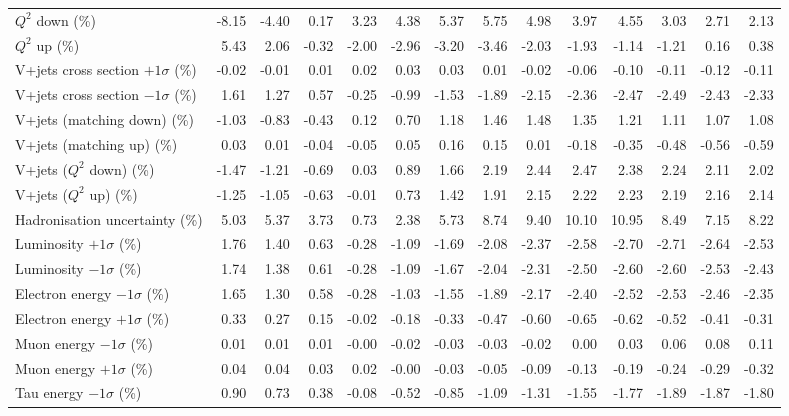 \begin{table}[htbp]
{\begin{tabular}{lrrrrrrrrrrrrr}
$Q^{2}$ down (\%) & -8.15 & -4.40 & 0.17 & 3.23 & 4.38 & 5.37 & 5.75 & 4.98 & 3.97 & 4.55 & 3.03 & 2.71 & 2.13 \\ 
$Q^{2}$ up (\%) & 5.43 & 2.06 & -0.32 & -2.00 & -2.96 & -3.20 & -3.46 & -2.03 & -1.93 & -1.14 & -1.21 & 0.16 & 0.38 \\ 
V+jets cross section \ensuremath{+1\sigma} (\%) & -0.02 & -0.01 & 0.01 & 0.02 & 0.03 & 0.03 & 0.01 & -0.02 & -0.06 & -0.10 & -0.11 & -0.12 & -0.11 \\ 
V+jets cross section \ensuremath{-1\sigma} (\%) & 1.61 & 1.27 & 0.57 & -0.25 & -0.99 & -1.53 & -1.89 & -2.15 & -2.36 & -2.47 & -2.49 & -2.43 & -2.33 \\ 
V+jets (matching down) (\%) & -1.03 & -0.83 & -0.43 & 0.12 & 0.70 & 1.18 & 1.46 & 1.48 & 1.35 & 1.21 & 1.11 & 1.07 & 1.08 \\ 
V+jets (matching up) (\%) & 0.03 & 0.01 & -0.04 & -0.05 & 0.05 & 0.16 & 0.15 & 0.01 & -0.18 & -0.35 & -0.48 & -0.56 & -0.59 \\ 
V+jets ($Q^{2}$ down) (\%) & -1.47 & -1.21 & -0.69 & 0.03 & 0.89 & 1.66 & 2.19 & 2.44 & 2.47 & 2.38 & 2.24 & 2.11 & 2.02 \\ 
V+jets ($Q^{2}$ up) (\%) & -1.25 & -1.05 & -0.63 & -0.01 & 0.73 & 1.42 & 1.91 & 2.15 & 2.22 & 2.23 & 2.19 & 2.16 & 2.14 \\ 
Hadronisation uncertainty (\%) & 5.03 & 5.37 & 3.73 & 0.73 & 2.38 & 5.73 & 8.74 & 9.40 & 10.10 & 10.95 & 8.49 & 7.15 & 8.22 \\ 
Luminosity $+1\sigma$ (\%) & 1.76 & 1.40 & 0.63 & -0.28 & -1.09 & -1.69 & -2.08 & -2.37 & -2.58 & -2.70 & -2.71 & -2.64 & -2.53 \\ 
Luminosity $-1\sigma$ (\%) & 1.74 & 1.38 & 0.61 & -0.28 & -1.09 & -1.67 & -2.04 & -2.31 & -2.50 & -2.60 & -2.60 & -2.53 & -2.43 \\ 
Electron energy $-1\sigma$ (\%) & 1.65 & 1.30 & 0.58 & -0.28 & -1.03 & -1.55 & -1.89 & -2.17 & -2.40 & -2.52 & -2.53 & -2.46 & -2.35 \\ 
Electron energy $+1\sigma$ (\%) & 0.33 & 0.27 & 0.15 & -0.02 & -0.18 & -0.33 & -0.47 & -0.60 & -0.65 & -0.62 & -0.52 & -0.41 & -0.31 \\ 
Muon energy $-1\sigma$ (\%) & 0.01 & 0.01 & 0.01 & -0.00 & -0.02 & -0.03 & -0.03 & -0.02 & 0.00 & 0.03 & 0.06 & 0.08 & 0.11 \\ 
Muon energy $+1\sigma$ (\%) & 0.04 & 0.04 & 0.03 & 0.02 & -0.00 & -0.03 & -0.05 & -0.09 & -0.13 & -0.19 & -0.24 & -0.29 & -0.32 \\ 
Tau energy $-1\sigma$ (\%) & 0.90 & 0.73 & 0.38 & -0.08 & -0.52 & -0.85 & -1.09 & -1.31 & -1.55 & -1.77 & -1.89 & -1.87 & -1.80 \\ 

\end{tabular}}
\end{table}
